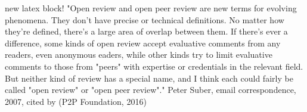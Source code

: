 new latex block! "Open review and open peer review are new terms for evolving phenomena. They don't have precise or technical definitions. No matter how they're defined, there's a large area of overlap between them. If there's ever a difference, some kinds of open review accept evaluative comments from any readers, even anonymous eaders, while other kinds try to limit evaluative comments to those from
"peers" with expertise or credentials in the relevant field. But
neither kind of review has a special name, and I think each could fairly be
called "open review" or "open peer review"."
Peter Suber, email
correspondence, 2007, cited by (P2P
Foundation, 2016)

